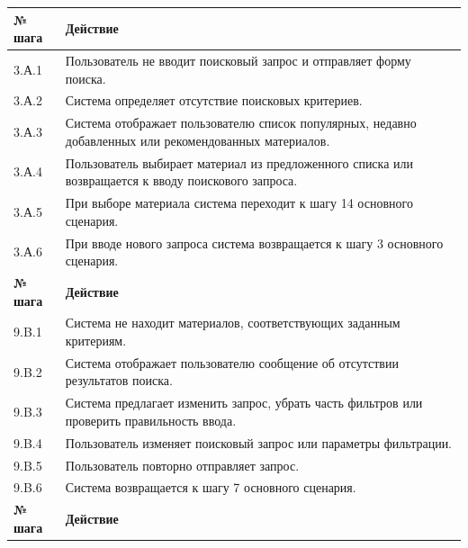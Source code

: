 \documentclass[12pt,a4paper]{article}
\begin{document}
\begin{xltabular}{\textwidth}{
			|>{\raggedright\arraybackslash}p{2.7cm}
			|>{\raggedright\arraybackslash}X|
		}
		
		\textbf{№ шага} & \textbf{Действие} \\
		\hline
		
		3.А.1 & Пользователь не вводит поисковый запрос и отправляет форму поиска. \\
		\hline
		3.А.2 & Система определяет отсутствие поисковых критериев. \\
		\hline
		3.А.3 & Система отображает пользователю список популярных, недавно
		добавленных или рекомендованных материалов. \\
		\hline
		3.А.4 & Пользователь выбирает материал из предложенного списка или
		возвращается к вводу поискового запроса. \\
		\hline
		3.А.5 & При выборе материала система переходит к шагу 14 основного
		сценария. \\
		\hline
		3.А.6 & При вводе нового запроса система возвращается к шагу 3 основного
		сценария. \\
		\hline
		
		
		\textbf{№ шага} & \textbf{Действие} \\
		\hline
		
		9.B.1 & Система не находит материалов, соответствующих заданным
		критериям. \\
		\hline
		9.B.2 & Система отображает пользователю сообщение об отсутствии
		результатов поиска. \\
		\hline
		9.B.3 & Система предлагает изменить запрос, убрать часть фильтров или
		проверить правильность ввода. \\
		\hline
		9.B.4 & Пользователь изменяет поисковый запрос или параметры фильтрации. \\
		\hline
		9.B.5 & Пользователь повторно отправляет запрос. \\
		\hline
		9.B.6 & Система возвращается к шагу 7 основного сценария. \\
		\hline
		
		
		\textbf{№ шага} & \textbf{Действие} \\
		\hline
		

\end{xltabular}
\end{document}
